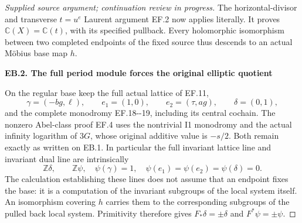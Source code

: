 \begin{proof}[Supplied source argument; continuation review in progress]
The horizontal-divisor and transverse \(t=u^e\) Laurent argument
EF.2 now applies literally. It proves
\(\mathbb C(X)=\mathbb C(t)\), with its specified pullback.
Every holomorphic isomorphism between two completed endpoints of the fixed
source thus descends to an actual Möbius base map \(h\).

\par

\medskip\noindent\textbf{EB.2. The full period module forces the original elliptic quotient}

\par\nobreak

On the regular base keep the full actual lattice of EF.11,
\[
 \gamma=(-bg,\ell),\qquad e_1=(1,0),\qquad
 e_2=(\tau,ag),\qquad\delta=(0,1),
 \tag{EB.2}
\]
and the complete monodromy EF.18-\/-19, including its central cochain.
The nonzero Abel-class proof EF.4 uses the nontrivial I1 monodromy
and the actual infinity logarithm of \(3G\), whose original
additive value is \(-s/2\). Both remain exactly as written on EB.1.
In particular the full invariant lattice line and invariant dual line
are intrinsically
\[
       \mathbb Z\delta,\qquad\mathbb Z\psi,
       \quad\psi(\gamma)=1,\quad\psi(e_1)=\psi(e_2)=\psi(\delta)=0.
 \tag{EB.3}
\]
The calculation establishing these lines does not assume that an
endpoint fixes the base: it is a computation of the invariant
subgroups of the local system itself. An isomorphism covering
\(h\) carries them to the corresponding subgroups of the pulled
back local system. Primitivity therefore gives
\(F_*\delta=\pm\delta\) and \(F^*\psi=\pm\psi\).


\end{proof}
